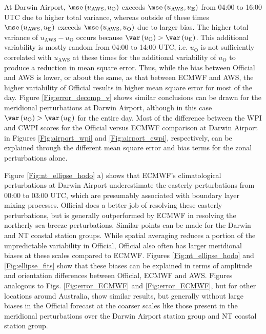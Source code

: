 \documentclass{article}
\begin{document}
At Darwin Airport, $\mse\left(u_\text{AWS}, u_\text{O}\right)$ exceeds $\mse\left(u_\text{AWS}, u_\text{E}\right)$ from 04:00 to 16:00 UTC due to higher total variance, whereas outside of these times $\mse\left(u_\text{AWS}, u_\text{E}\right)$ exceeds $\mse\left(u_\text{AWS}, u_\text{O}\right)$ due to larger bias. The higher total variance of $u_\text{AWS} - u_\text{O}$ occurs because $\var\left(u_\text{O}\right) > \var\left(u_\text{E}\right)$. This additional variability is mostly random from 04:00 to 14:00 UTC, i.e. $u_\text{O}$ is not sufficiently correlated with $u_\text{AWS}$ at these times for the additional variability of $u_\text{O}$ to produce a reduction in mean square error. Thus, while the bias between Official and AWS is lower, or about the same, as that between ECMWF and AWS, the higher variability of Official results in higher mean square error for most of the day. Figure \ref{Fig:error_decomp_v} shows similar conclusions can be drawn for the meridional perturbations at Darwin Airport, although in this case $\var\left(u_\text{O}\right) > \var\left(u_\text{E}\right)$ for the entire day. Most of the difference between the WPI and CWPI scores for the Official versus ECMWF comparison at Darwin Airport in Figures \ref{Fig:airport_wpi} and \ref{Fig:airport_cwpi}, respectively, can be explained through the different mean square error and bias terms for the zonal perturbations alone. 



Figure \ref{Fig:nt_ellipse_hodo} a) shows that ECMWF's climatological perturbations at Darwin Airport underestimate the easterly perturbations from 00:00 to 03:00 UTC, which are presumably associated with boundary layer mixing processes. Official does a better job of resolving these easterly perturbations, but is generally outperformed by ECMWF in resolving the northerly sea-breeze perturbations. Similar points can be made for the Darwin and NT coastal station groups. While spatial averaging reduces a portion of the unpredictable variability in Official, Official also often has larger meridional biases at these scales compared to ECMWF. Figures \ref{Fig:nt_ellipse_hodo} and \ref{Fig:ellipse_fits} show that these biases can be explained in terms of amplitude and orientation differences between Official, ECMWF and AWS. Figures analogous to Figs. \ref{Fig:error_ECMWF} and \ref{Fig:error_ECMWF}, but for other locations around Australia, show similar results, but generally without large biases in the Official forecast at the coarser scales like those present in the meridional perturbations over the Darwin Airport station group and NT coastal station group.   
\end{document}
